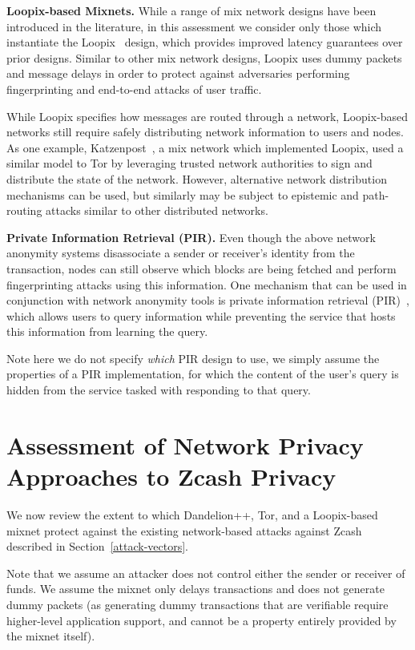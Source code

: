 \documentclass{article}
\begin{document}
\textbf{Loopix-based Mixnets.}
While a range of mix network designs have been introduced in the literature, in
this assessment we consider only those which instantiate the
Loopix~\cite{Piotrowska:2017:LAS} design, which provides improved latency
guarantees over prior designs. Similar to other mix network designs, Loopix
uses dummy packets and message delays in order to protect against adversaries
performing fingerprinting and end-to-end attacks of user traffic.

While Loopix specifies how messages are routed through a network, Loopix-based
networks still require safely distributing network information to users and
nodes. As one example, Katzenpost~\cite{katzenpost}, a mix network which implemented
Loopix,  used a similar model to Tor
by leveraging trusted network authorities to sign and distribute the state of
the network. However, alternative network distribution mechanisms can be used,
but similarly may be subject to epistemic and path-routing attacks similar to
other distributed networks.

\textbf{Private Information Retrieval (PIR).}
Even though the above network anonymity systems disassociate a sender or
receiver's identity from the transaction, nodes can still observe which blocks
are being fetched and perform fingerprinting attacks using this information.
One mechanism that can be used in conjunction with network anonymity tools is
private information retrieval (PIR)~\cite{pir}, which allows users to query information
while preventing the service that hosts this information from learning the
query.

Note here we do not specify \emph{which} PIR design to use, we simply assume
the properties of a PIR implementation, for which the content of the user's
query is hidden from the service tasked with responding to that query.


\section{Assessment of Network Privacy Approaches to Zcash Privacy}
\label{network-privacy-assessment}

We now review the extent to which Dandelion++, Tor, and a Loopix-based mixnet
protect against the existing network-based attacks against Zcash described in
Section~\ref{attack-vectors}.

Note that we assume an attacker does not control either the sender or receiver
of funds. We assume the mixnet only delays transactions and does not generate
dummy packets (as generating dummy transactions that are verifiable require
higher-level application support, and cannot be a property entirely provided by
the mixnet itself).
\end{document}
